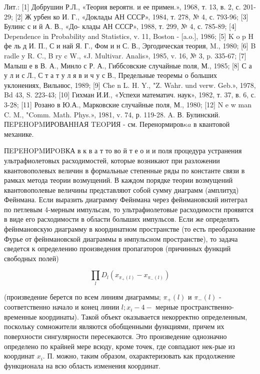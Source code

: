 \documentclass[10pt]{article}
\begin{document}
Лит.: [1] Добрушин Р.Л., «Теория вероятн. и ее примен.», 1968, т. 13, в. 2, с. 201-29; [2] Ж урбен ко И. Г., «Доклады АН СССР», 1984, т. 278, № 4, с. 793-96; [3] Булинс с и й А. В., «До- клады АН СССР», 1988, т. 299, № 4, с. 785-89; [4] Dependence in Probability and Statistics, v. 11, Boston - [a.o.], 1986; [5] K o p H фе ль д И. П., С и най Я. Г., Фом и н С. В., Эргодическая теория, M., 1980; [6] B radle y R. C., B ry c W., «J. Multivar. Analis», 1985, v. 16, № 3, p. 335-67; [7] Малыш е в В. А., Минло с Р. А., Гиббсовские случайные поля, М., 1985; [8] С а у л и с Л., С т а т у л я в и ч у с В., Предельные теоремы о больших уклонениях, Вильнюс, 1989; [9] Che n L. H. Y., "Z. Wahr. und verw. Geb.», 1978, Bd 43, S. 223-43; [10] Гихман И.И., «Успехи математич. наук», 1982, т. 37, в. 6, с. 3-28; [11] Розано в Ю.А., Марковские случайные поля, М., 1980; [12] N e w man C. M., "Comm. Math. Phys.», 1981, v. 74, р. 119-28. A. В. Булинский. ПEPEHOPMИРОВАНHАЯ TEOPИЯ - см. Перенормиров$\kappa a$ в квантовой механике.



ПEPEHOPMИPOBКА в к в а т то во й т е о и и поля процедура устранения ультрафиолетовых расходимостей, которые возникают при разложении квантовополевых величин в формальные степенные ряды по константе связи в рамках метода теории возмущений. В каждом порядке теории возмущений квантовополевые величины представляют собой сумму диаграмм (амплитуд) Фейнмана. Если выразить диаграмму Фейнмана через фейнмановский интеграл по петлевым 4-мерным импульсам, то ультрафиолетовые расходимости проявятся в виде его расходимости в области болыших импульсов. Если же определять фейнмановскую диаграмму в координатном пространстве (то есть преобразование Фурье от фейнмановской диаграммы в импульсном пространстве), то задача сведется к определению произведения пропагаторов (причинных функций свободных полей)



\[

\prod_{l} D_{l}\left(x_{\pi_{+}(l)}-x_{\pi_{-}(l)}\right)

\]



(произведение берется по всем линиям диаграммы; $\pi_{+}(l)$ и $\pi_{-}(l)$ - соответственно начало и конец линии $l ; x_{i}-4-$ мерные пространственно-временные координаты). Такой объект оказывается некорректно определенным, поскольку сомножители являются обобщенными функциями, причем их поверхности сингулярности пересекаются. Это произведение однозначно определено по крайней мере всюду, кроме точек, где совпадают нек-рые из координат $x_{i}$. П. можно, таким образом, охарактеризовать как продолжение функционала на всю область изменения координат.
\end{document}

